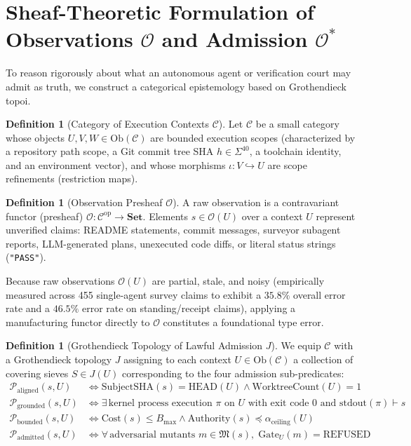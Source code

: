 \documentclass[10pt,twoside,openany]{book}
\theoremstyle{plain}
\theoremstyle{definition}
\newtheorem{definition}[theorem]{Definition}
\theoremstyle{remark}
\newcommand{\Oraw}{\mathcal{O}}
\newcommand{\Oadm}{\mathcal{O}^*}
\begin{document}
\section{Sheaf-Theoretic Formulation of Observations $\Oraw$ and Admission $\Oadm$}
To reason rigorously about what an autonomous agent or verification court may admit as truth, we construct a categorical epistemology based on Grothendieck topoi.

\begin{definition}[Category of Execution Contexts $\mathcal{C}$]
Let $\mathcal{C}$ be a small category whose objects $U, V, W \in \mathrm{Ob}(\mathcal{C})$ are bounded execution scopes (characterized by a repository path scope, a Git commit tree SHA $h \in \Sigma^{40}$, a toolchain identity, and an environment vector), and whose morphisms $\iota: V \hookrightarrow U$ are scope refinements (restriction maps).
\end{definition}

\begin{definition}[Observation Presheaf $\Oraw$]
A raw observation is a contravariant functor (presheaf) $\Oraw: \mathcal{C}^{\mathrm{op}} \to \mathbf{Set}$. Elements $s \in \Oraw(U)$ over a context $U$ represent unverified claims: README statements, commit messages, surveyor subagent reports, LLM-generated plans, unexecuted code diffs, or literal status strings (\texttt{"PASS"}).
\end{definition}

Because raw observations $\Oraw(U)$ are partial, stale, and noisy (empirically measured across 455 single-agent survey claims to exhibit a $35.8\%$ overall error rate and a $46.5\%$ error rate on standing/receipt claims), applying a manufacturing functor directly to $\Oraw$ constitutes a foundational type error.

\begin{definition}[Grothendieck Topology of Lawful Admission $J$]
We equip $\mathcal{C}$ with a Grothendieck topology $J$ assigning to each context $U \in \mathrm{Ob}(\mathcal{C})$ a collection of covering sieves $S \in J(U)$ corresponding to the four admission sub-predicates:
\begin{align}
\mathcal{P}_{\mathrm{aligned}}(s, U) &\iff \mathrm{SubjectSHA}(s) = \mathrm{HEAD}(U) \land \mathrm{WorktreeCount}(U) = 1 \\
\mathcal{P}_{\mathrm{grounded}}(s, U) &\iff \exists\, \text{kernel process execution } \pi \text{ on } U \text{ with exit code } 0 \text{ and } \mathrm{stdout}(\pi) \vdash s \\
\mathcal{P}_{\mathrm{bounded}}(s, U) &\iff \mathrm{Cost}(s) \le B_{\mathrm{max}} \land \mathrm{Authority}(s) \preceq \alpha_{\mathrm{ceiling}}(U) \\
\mathcal{P}_{\mathrm{admitted}}(s, U) &\iff \forall\,\text{adversarial mutants } m \in \mathfrak{M}(s),\; \mathrm{Gate}_U(m) = \mathrm{REFUSED}
\end{align}
\end{definition}
\end{document}
